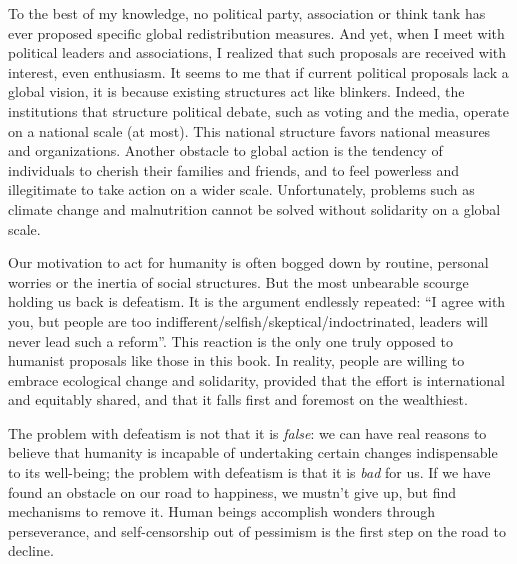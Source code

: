 \documentclass[a5paper,english,openany]{memoir}
\begin{document}
To the best of my knowledge, no political party, association or think tank has ever proposed specific global redistribution measures. And yet, when I meet with political leaders and associations, I realized that such proposals are received with interest, even enthusiasm. It seems to me that if current political proposals lack a global vision, it is because existing structures act like blinkers. Indeed, the institutions that structure political debate, such as voting and the media, operate on a national scale (at most). This national structure favors national measures and organizations. Another obstacle to global action is the tendency of individuals to cherish their families and friends, and to feel powerless and illegitimate to take action on a wider scale. %
Unfortunately, problems such as climate change and malnutrition cannot be solved without solidarity on a global scale. 

Our motivation to act for humanity is often bogged down by routine, personal worries or the inertia of social structures. %
But the most unbearable scourge holding us back is defeatism. It is the argument endlessly repeated: ``I agree with you, but people are too indifferent/selfish/skeptical/indoctrinated, leaders will never lead such a reform''. This reaction is the only one truly opposed to humanist proposals like those in this book. %
In reality, people are willing to embrace ecological change and solidarity, provided that the effort is international and equitably shared, and that it falls first and foremost on the wealthiest. %



The problem with defeatism is not that it is \textit{false}: we can have real reasons to believe that humanity is incapable of undertaking certain changes indispensable to its well-being; the problem with defeatism is that it is \textit{bad} for us. If we have found an obstacle on our road to happiness, we mustn't give up, but find mechanisms to remove it. Human beings accomplish wonders through perseverance, and self-censorship out of pessimism is the first step on the road to decline. 
\end{document}
